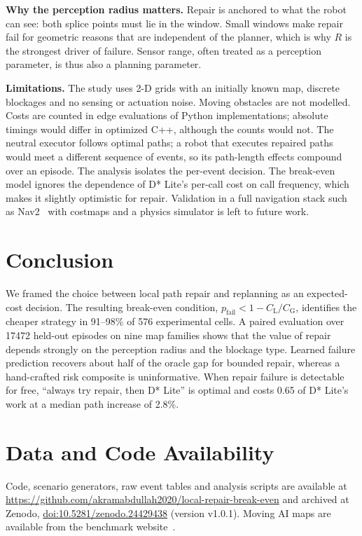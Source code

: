 \documentclass[11pt,a4paper]{article}
\newcommand{\CL}{C_{\mathrm{L}}}
\newcommand{\CG}{C_{\mathrm{G}}}
\newcommand{\pfail}{p_{\mathrm{fail}}}
\begin{document}
\textbf{Why the perception radius matters.} Repair is anchored to what the robot can see: both splice points must lie in the window. Small windows make repair fail for geometric reasons that are independent of the planner, which is why $R$ is the strongest driver of failure. Sensor range, often treated as a perception parameter, is thus also a planning parameter.

\textbf{Limitations.} The study uses 2-D grids with an initially known map, discrete blockages and no sensing or actuation noise. Moving obstacles are not modelled. Costs are counted in edge evaluations of Python implementations; absolute timings would differ in optimized C++, although the counts would not. The neutral executor follows optimal paths; a robot that executes repaired paths would meet a different sequence of events, so its path-length effects compound over an episode. The analysis isolates the per-event decision. The break-even model ignores the dependence of D* Lite's per-call cost on call frequency, which makes it slightly optimistic for repair. Validation in a full navigation stack such as Nav2~\cite{macenski2020nav2} with costmaps and a physics simulator is left to future work.

\section{Conclusion}
We framed the choice between local path repair and replanning as an expected-cost decision. The resulting break-even condition, $\pfail<1-\CL/\CG$, identifies the cheaper strategy in 91--98\% of 576 experimental cells. A paired evaluation over \num{17472} held-out episodes on nine map families shows that the value of repair depends strongly on the perception radius and the blockage type. Learned failure prediction recovers about half of the oracle gap for bounded repair, whereas a hand-crafted risk composite is uninformative. When repair failure is detectable for free, ``always try repair, then D* Lite'' is optimal and costs 0.65 of D* Lite's work at a median path increase of 2.8\%.

\section*{Data and Code Availability}
Code, scenario generators, raw event tables and analysis scripts are available at \url{https://github.com/akramabdullah2020/local-repair-break-even} and archived at Zenodo, \href{https://doi.org/10.5281/zenodo.24429438}{doi:10.5281/zenodo.24429438} (version v1.0.1). Moving AI maps are available from the benchmark website~\cite{sturtevant2012}.



\end{document}
